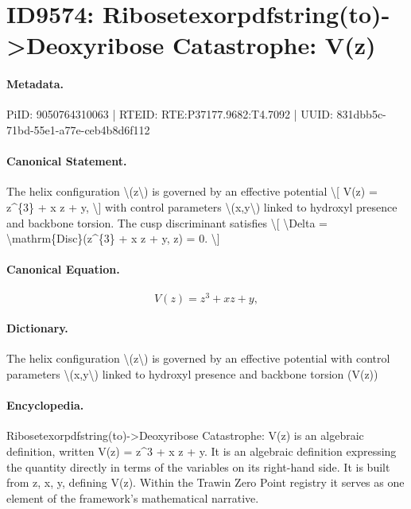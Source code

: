 \section*{ID9574: Ribosetexorpdfstring(to)->Deoxyribose Catastrophe: V(z)}
\paragraph{Metadata.}
PiID: 9050764310063 | RTEID: RTE:P37177.9682:T4.7092 | UUID: 831dbb5c-71bd-55e1-a77e-ceb4b8d6f112

\paragraph{Canonical Statement.}
The helix configuration \textbackslash{}(z\textbackslash{}) is governed by an effective potential \textbackslash{}[ V(z) = z\textasciicircum{}\{3\} + x z + y, \textbackslash{}] with control parameters \textbackslash{}(x,y\textbackslash{}) linked to hydroxyl presence and backbone torsion. The cusp discriminant satisfies \textbackslash{}[ \textbackslash{}Delta = \textbackslash{}mathrm\{Disc\}(z\textasciicircum{}\{3\} + x z + y, z) = 0. \textbackslash{}]

\paragraph{Canonical Equation.}
\[
V(z) = z^{3} + x z + y,
\]

\paragraph{Dictionary.}
The helix configuration \textbackslash{}(z\textbackslash{}) is governed by an effective potential with control parameters \textbackslash{}(x,y\textbackslash{}) linked to hydroxyl presence and backbone torsion (V(z))

\paragraph{Encyclopedia.}
Ribosetexorpdfstring(to)->Deoxyribose Catastrophe: V(z) is an algebraic definition, written V(z) = z\textasciicircum{}3 + x z + y. It is an algebraic definition expressing the quantity directly in terms of the variables on its right-hand side. It is built from z, x, y, defining V(z). Within the Trawin Zero Point registry it serves as one element of the framework's mathematical narrative.
